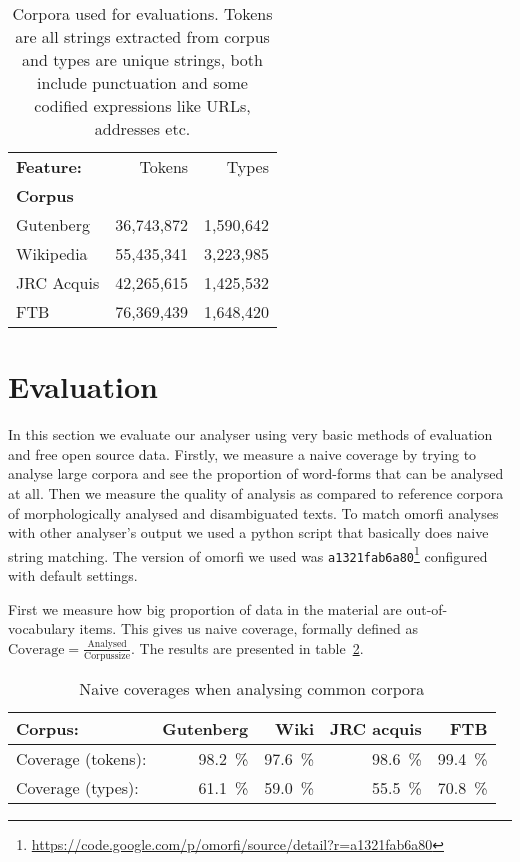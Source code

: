 \documentclass[a4paper,12pt]{article}
\begin{document}
\begin{table}
    \begin{scriptsize}
  \centering
    \begin{tabular}{|l|r|r|}
        \hline
        \bf Feature: & Tokens     & Types     \\
        \bf Corpus   &            &           \\
        \hline
        Gutenberg    & 36,743,872 & 1,590,642 \\
        Wikipedia    & 55,435,341 & 3,223,985 \\
        JRC Acquis   & 42,265,615 & 1,425,532 \\
        FTB          & 76,369,439 & 1,648,420 \\
        \hline
    \end{tabular}
  \caption{Corpora used for evaluations. Tokens are all strings extracted from
      corpus and types are unique strings, both include punctuation and some
      codified expressions like URLs, addresses etc.
  \label{table:corpora}}
  \end{scriptsize}
\end{table}

\section{Evaluation}
\label{sec:evaluation}

In this section we evaluate our analyser using very basic methods of
evaluation and free open source data. Firstly, we measure a naive coverage by
trying to analyse large corpora and see the proportion of word-forms that can
be analysed at all. Then we measure the quality of analysis as compared to
reference corpora of morphologically analysed and disambiguated texts. To
match omorfi analyses with other analyser's output we used a python script
that basically does naive string matching. The version of omorfi we used
was 
\verb|a1321fab6a80|\footnote{\url{https://code.google.com/p/omorfi/source/detail?r=a1321fab6a80}} 
configured with default settings.


First we measure how big proportion of data in the material are
out-of-vocabulary items. This gives us naive coverage, formally defined as
$\mathrm{Coverage} = \frac{\mathrm{Analysed}}{\mathrm{Corpus size}}$.
The results are presented in table~\ref{table:coverage}. 

\begin{table}
    \begin{scriptsize}
    \centering
    \begin{tabular}{|l|r|r|r|r|}
        \hline
        Corpus:            & \bf Gutenberg & \bf Wiki & \bf JRC acquis & \bf FTB \\
        \hline
        Coverage (tokens): & 98.2~\%       & 97.6~\%  & 98.6~\%        & 99.4~\% \\
        Coverage (types):  & 61.1~\%       & 59.0~\%  & 55.5~\%        & 70.8~\% \\
        \hline
    \end{tabular}
    \caption{Naive coverages when analysing common corpora
    \label{table:coverage}}
  \end{scriptsize}
\end{table}
\end{document}
